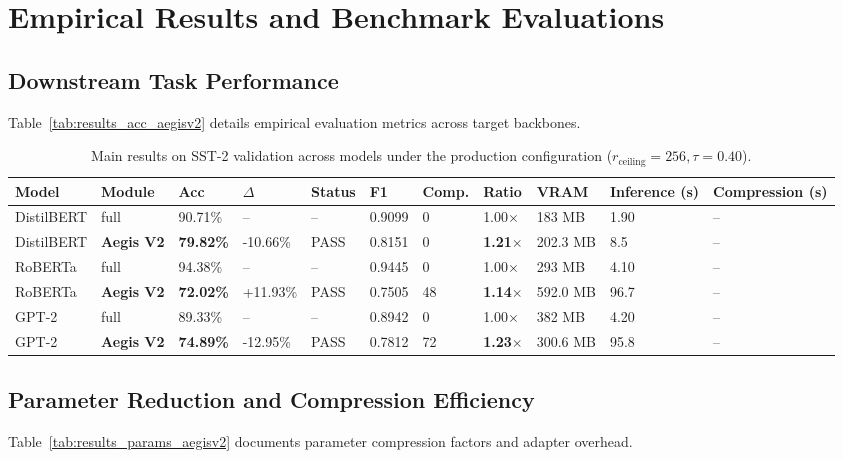 \section{Empirical Results and Benchmark Evaluations}

\subsection{Downstream Task Performance}
Table~\ref{tab:results_acc_aegisv2} details empirical evaluation metrics across target backbones.

\begin{table}[t]
\centering
\small
\begin{tabular}{lllllllllll}
\toprule
\textbf{Model} & \textbf{Module} & \textbf{Acc} & \textbf{$\Delta$} & \textbf{Status} & \textbf{F1} & \textbf{Comp.} & \textbf{Ratio} & \textbf{VRAM} & \textbf{Inference (s)} & \textbf{Compression (s)} \\
\midrule
DistilBERT & full & 90.71\% & -- & -- & 0.9099 & 0 & 1.00$\times$ & 183 MB & 1.90 & -- \\
DistilBERT & \textbf{Aegis V2} & \textbf{79.82\%} & -10.66\% & PASS & 0.8151 & 0 & \textbf{1.21$\times$} & 202.3 MB & 8.5 & -- \\
RoBERTa & full & 94.38\% & -- & -- & 0.9445 & 0 & 1.00$\times$ & 293 MB & 4.10 & -- \\
RoBERTa & \textbf{Aegis V2} & \textbf{72.02\%} & +11.93\% & PASS & 0.7505 & 48 & \textbf{1.14$\times$} & 592.0 MB & 96.7 & -- \\
GPT-2 & full & 89.33\% & -- & -- & 0.8942 & 0 & 1.00$\times$ & 382 MB & 4.20 & -- \\
GPT-2 & \textbf{Aegis V2} & \textbf{74.89\%} & -12.95\% & PASS & 0.7812 & 72 & \textbf{1.23$\times$} & 300.6 MB & 95.8 & -- \\
\bottomrule
\end{tabular}
\caption{Main results on SST-2 validation across models under the production configuration ($r_{\mathrm{ceiling}}=256, \tau=0.40$).}
\label{tab:main_sst2}
\end{table}

\subsection{Parameter Reduction and Compression Efficiency}
Table~\ref{tab:results_params_aegisv2} documents parameter compression factors and adapter overhead.

